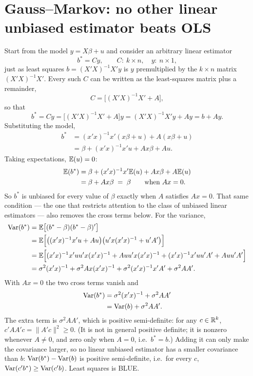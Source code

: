 \documentclass[11pt]{article}
\begin{document}
\section{Gauss--Markov: no other linear unbiased estimator beats OLS}

Start from the model $y=X\beta+u$ and consider an arbitrary linear estimator
\[ b^{*}=Cy,\qquad C:\ k\times n,\quad y:\ n\times1, \]
just as least squares $b=(X'X)^{-1}X'y$ is $y$ premultiplied by the $k\times n$
matrix $(X'X)^{-1}X'$.
Every such $C$ can be written as the least-squares matrix plus a remainder,
\[ C=\bigl[(X'X)^{-1}X'+A\bigr], \]
so that
\[ b^{*}=Cy=\bigl[(X'X)^{-1}X'+A\bigr]y=(X'X)^{-1}X'y+Ay=b+Ay . \]
Substituting the model,
\[
\begin{aligned}
  b^{*}&=(x'x)^{-1}x'(x\beta+u)+A(x\beta+u)\\
       &=\beta+(x'x)^{-1}x'u+Ax\beta+Au .
\end{aligned}
\]
Taking expectations, $\mathbb{E}(u)=0$:
\[
\begin{aligned}
  \mathbb{E}(b^{*})&=\beta+(x'x)^{-1}x'\mathbb{E}(u)+Ax\beta+A\mathbb{E}(u)\\
           &=\beta+Ax\beta\;=\;\beta \qquad\text{when } Ax=0 .
\end{aligned}
\]
So $b^{*}$ is unbiased for every value of $\beta$ exactly when $A$ satisfies $Ax=0$. That same condition --- the
one that restricts attention to the class of unbiased linear estimators --- also
removes the cross terms below. For the variance,
\[
\begin{aligned}
  \operatorname{Var}(b^{*})&=\mathbb{E}\bigl[(b^{*}-\beta)(b^{*}-\beta)'\bigr]\\
             &=\mathbb{E}\Bigl[\bigl((x'x)^{-1}x'u+Au\bigr)\bigl(u'x(x'x)^{-1}+u'A'\bigr)\Bigr]\\
             &=\mathbb{E}\Bigl[(x'x)^{-1}x'uu'x(x'x)^{-1}+Auu'x(x'x)^{-1}
                    +(x'x)^{-1}x'uu'A'+Auu'A'\Bigr]\\
             &=\sigma^{2}(x'x)^{-1}+\sigma^{2}Ax(x'x)^{-1}
               +\sigma^{2}(x'x)^{-1}x'A'+\sigma^{2}AA' .
\end{aligned}
\]
With $Ax=0$ the two cross terms vanish and
\[
\begin{aligned}
  \operatorname{Var}(b^{*})&=\sigma^{2}(x'x)^{-1}+\sigma^{2}AA'\\
             &=\operatorname{Var}(b)+\sigma^{2}AA' .
\end{aligned}
\]
The extra term is $\sigma^{2}AA'$, which is positive semi-definite: for any
$c\in\mathbb{R}^{k}$, $c'AA'c=\|A'c\|^{2}\ge0$. (It is not in general positive definite;
it is nonzero whenever $A\ne0$, and zero only when $A=0$, i.e.\ $b^{*}=b$.) Adding
it can only make the covariance larger, so no linear unbiased estimator has a
smaller covariance than $b$: $\operatorname{Var}(b^{*})-\operatorname{Var}(b)$ is positive semi-definite, i.e.\
for every $c$, $\operatorname{Var}(c'b^{*})\ge\operatorname{Var}(c'b)$. Least squares is BLUE.
\end{document}
